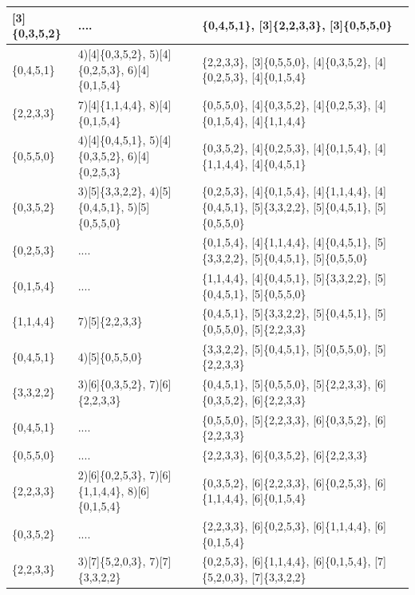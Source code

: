 \documentclass{article}
\begin{document}
\begin{center}
\begin{longtable}{ |p{2cm}|p{2cm}|>{\raggedright\arraybackslash}p{7cm}|  }
    [3]\{0,3,5,2\} & .... & [3]\{0,4,5,1\}, [3]\{2,2,3,3\}, [3]\{0,5,5,0\} \\ 
    \hline
    [3]\{0,4,5,1\} & 4)[4]\{0,3,5,2\}, 5)[4]\{0,2,5,3\}, 6)[4]\{0,1,5,4\} & [3]\{2,2,3,3\}, [3]\{0,5,5,0\}, [4]\{0,3,5,2\}, [4]\{0,2,5,3\}, [4]\{0,1,5,4\} \\ 
    \hline
    [3]\{2,2,3,3\} & 7)[4]\{1,1,4,4\}, 8)[4]\{0,1,5,4\} & [3]\{0,5,5,0\}, [4]\{0,3,5,2\}, [4]\{0,2,5,3\}, [4]\{0,1,5,4\}, [4]\{1,1,4,4\} \\ 
    \hline
    [3]\{0,5,5,0\} & 4)[4]\{0,4,5,1\}, 5)[4]\{0,3,5,2\}, 6)[4]\{0,2,5,3\} & [4]\{0,3,5,2\}, [4]\{0,2,5,3\}, [4]\{0,1,5,4\}, [4]\{1,1,4,4\}, [4]\{0,4,5,1\} \\ 
    \hline
    [4]\{0,3,5,2\} & 3)[5]\{3,3,2,2\}, 4)[5]\{0,4,5,1\}, 5)[5]\{0,5,5,0\} & [4]\{0,2,5,3\}, [4]\{0,1,5,4\}, [4]\{1,1,4,4\}, [4]\{0,4,5,1\}, [5]\{3,3,2,2\}, [5]\{0,4,5,1\}, [5]\{0,5,5,0\} \\ 
    \hline
    [4]\{0,2,5,3\} & .... & [4]\{0,1,5,4\}, [4]\{1,1,4,4\}, [4]\{0,4,5,1\}, [5]\{3,3,2,2\}, [5]\{0,4,5,1\}, [5]\{0,5,5,0\} \\ 
    \hline
    [4]\{0,1,5,4\} & .... & [4]\{1,1,4,4\}, [4]\{0,4,5,1\}, [5]\{3,3,2,2\}, [5]\{0,4,5,1\}, [5]\{0,5,5,0\} \\ 
    \hline
    [4]\{1,1,4,4\} & 7)[5]\{2,2,3,3\} & [4]\{0,4,5,1\}, [5]\{3,3,2,2\}, [5]\{0,4,5,1\}, [5]\{0,5,5,0\}, [5]\{2,2,3,3\} \\ 
    \hline
    [4]\{0,4,5,1\} & 4)[5]\{0,5,5,0\} & [5]\{3,3,2,2\}, [5]\{0,4,5,1\}, [5]\{0,5,5,0\}, [5]\{2,2,3,3\} \\ 
    \hline
    [5]\{3,3,2,2\} & 3)[6]\{0,3,5,2\}, 7)[6]\{2,2,3,3\} & [5]\{0,4,5,1\}, [5]\{0,5,5,0\}, [5]\{2,2,3,3\}, [6]\{0,3,5,2\}, [6]\{2,2,3,3\} \\ 
    \hline
    [5]\{0,4,5,1\} & .... & [5]\{0,5,5,0\}, [5]\{2,2,3,3\}, [6]\{0,3,5,2\}, [6]\{2,2,3,3\} \\ 
    \hline
    [5]\{0,5,5,0\} & .... & [5]\{2,2,3,3\}, [6]\{0,3,5,2\}, [6]\{2,2,3,3\} \\ 
    \hline
    [5]\{2,2,3,3\} & 2)[6]\{0,2,5,3\}, 7)[6]\{1,1,4,4\}, 8)[6]\{0,1,5,4\} & [6]\{0,3,5,2\}, [6]\{2,2,3,3\}, [6]\{0,2,5,3\}, [6]\{1,1,4,4\}, [6]\{0,1,5,4\} \\ 
    \hline
    [6]\{0,3,5,2\} & .... & [6]\{2,2,3,3\}, [6]\{0,2,5,3\}, [6]\{1,1,4,4\}, [6]\{0,1,5,4\} \\ 
    \hline
    [6]\{2,2,3,3\} & 3)[7]\{5,2,0,3\}, 7)[7]\{3,3,2,2\} & [6]\{0,2,5,3\}, [6]\{1,1,4,4\}, [6]\{0,1,5,4\}, [7]\{5,2,0,3\}, [7]\{3,3,2,2\} \\ 

\end{longtable}
\end{center}
\end{document}

